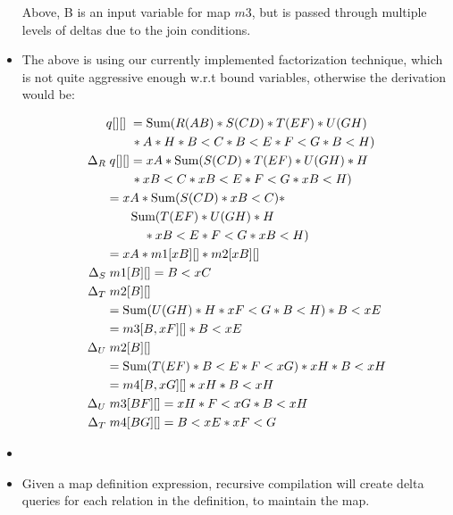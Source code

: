 \begin{itemize}
  Above, B is an input variable for map $m3$, but is passed through multiple
  levels of deltas due to the join conditions. 
  
  \item The above is using our currently implemented factorization technique,
  which is not quite aggressive enough w.r.t bound variables, otherwise the
  derivation would be:

  \begin{align*}
  & q[][] \; =
  \mbox{Sum}(R(AB)*S(CD)*T(EF)*U(GH) \\
  & \qquad * A * H * B<C * B<E * F<G  * B<H) \\
  \Delta_{R} & \; q[][] = xA*\mbox{Sum}(S(CD)*T(EF)*U(GH)*H \\
  & \qquad * xB<C * xB<E * F<G * xB<H)\\
  & = xA * \mbox{Sum}(S(CD) * xB<C) * \\
  & \qquad \mbox{Sum}(T(EF)*U(GH)*H\\
  & \qquad \quad * xB<E * F<G * xB<H)\\
  & = xA * m1[xB][] * m2[xB][]\\
  \Delta_{S} & \; m1[B][] = B<xC\\
  \Delta_{T} & \; m2[B][] \\
  & = \mbox{Sum}(U(GH)*H * xF<G * B<H) * B<xE\\ 
  & = m3[B,xF][] * B<xE\\
  \Delta_{U} & \; m2[B][]\\
  & = \mbox{Sum}(T(EF) * B<E * F<xG) * xH * B<xH\\
  & = m4[B,xG][] * xH * B<xH\\
  \Delta_{U} & \; m3[BF][] = xH * F<xG * B<xH\\
  \Delta_{T} & \; m4[BG][] = B<xE * xF<G  
  \end{align*}

  \item {}
  
  \item Given a map definition expression, recursive compilation will
  create delta queries for each relation in the definition, to maintain the map.
  

\end{itemize}
